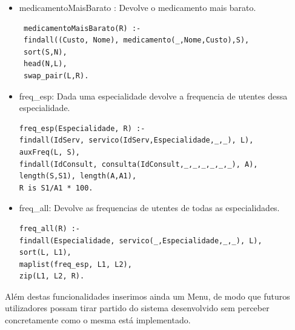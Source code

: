 \documentclass[25pt]{article}
\begin{document}
\begin{itemize}
 \item medicamentoMaisBarato : Devolve o medicamento mais barato.

 \begin{lstlisting}
 medicamentoMaisBarato(R) :-
 findall((Custo, Nome), medicamento(_,Nome,Custo),S),
 sort(S,N),
 head(N,L),
 swap_pair(L,R).
\end{lstlisting}


\item freq\_esp: Dada uma especialidade devolve a frequencia de utentes dessa
especialidade.

\begin{lstlisting}
freq_esp(Especialidade, R) :-
findall(IdServ, servico(IdServ,Especialidade,_,_), L),
auxFreq(L, S),
findall(IdConsult, consulta(IdConsult,_,_,_,_,_,_), A),
length(S,S1), length(A,A1),
R is S1/A1 * 100.
\end{lstlisting}


\item freq\_all: Devolve as frequencias de utentes de todas as especialidades.
\begin{lstlisting}
freq_all(R) :-
findall(Especialidade, servico(_,Especialidade,_,_), L),
sort(L, L1),
maplist(freq_esp, L1, L2),
zip(L1, L2, R).
\end{lstlisting}

 \end{itemize}

 Além destas funcionalidades inserimos ainda um Menu, de modo que futuros utilizadores possam tirar partido do sistema desenvolvido
 sem perceber concretamente como o mesma está implementado.
\end{document}
